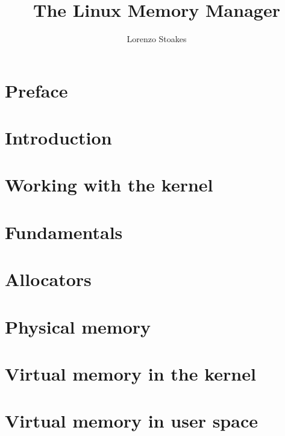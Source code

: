 \documentclass[a4paper,oneside]{scrbook}
\begin{document}
\title{The Linux Memory Manager}
\author{Lorenzo Stoakes}
\frontmatter
\date{} %
\maketitle
\tableofcontents


\chapter{Preface}


\mainmatter

\chapter{Introduction}


\chapter{Working with the kernel}


\chapter{Fundamentals}


\chapter{Allocators}


\chapter{Physical memory}


\chapter{Virtual memory in the kernel}


\chapter{Virtual memory in user space}

\end{document}
